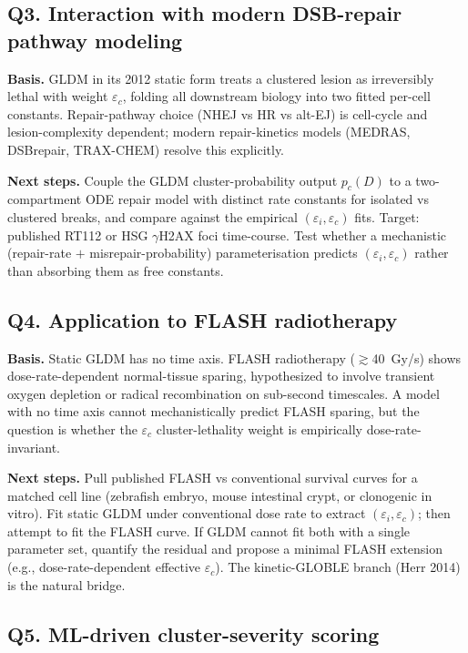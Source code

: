 \subsection*{Q3. Interaction with modern DSB-repair pathway modeling}

\textbf{Basis.} GLDM in its 2012 static form treats a clustered lesion as
irreversibly lethal with weight $\varepsilon_c$, folding all downstream
biology into two fitted per-cell constants. Repair-pathway choice
(NHEJ vs HR vs alt-EJ) is cell-cycle and lesion-complexity dependent; modern
repair-kinetics models (MEDRAS, DSBrepair, TRAX-CHEM) resolve this
explicitly.

\textbf{Next steps.} Couple the GLDM cluster-probability output $p_c(D)$
to a two-compartment ODE repair model with distinct rate constants for
isolated vs clustered breaks, and compare against the empirical
$(\varepsilon_i, \varepsilon_c)$ fits. Target: published RT112 or HSG
$\gamma$H2AX foci time-course. Test whether a mechanistic
(repair-rate $+$ misrepair-probability) parameterisation predicts
$(\varepsilon_i, \varepsilon_c)$ rather than absorbing them as free
constants.

\subsection*{Q4. Application to FLASH radiotherapy}

\textbf{Basis.} Static GLDM has no time axis. FLASH radiotherapy
($\gtrsim$40~Gy/s) shows dose-rate-dependent normal-tissue sparing,
hypothesized to involve transient oxygen depletion or radical recombination
on sub-second timescales. A model with no time axis cannot mechanistically
predict FLASH sparing, but the question is whether the $\varepsilon_c$
cluster-lethality weight is empirically dose-rate-invariant.

\textbf{Next steps.} Pull published FLASH vs conventional survival curves
for a matched cell line (zebrafish embryo, mouse intestinal crypt, or
clonogenic in vitro). Fit static GLDM under conventional dose rate to
extract $(\varepsilon_i, \varepsilon_c)$; then attempt to fit the FLASH
curve. If GLDM cannot fit both with a single parameter set, quantify the
residual and propose a minimal FLASH extension (e.g., dose-rate-dependent
effective $\varepsilon_c$). The kinetic-GLOBLE branch (Herr 2014) is the
natural bridge.

\subsection*{Q5. ML-driven cluster-severity scoring}

